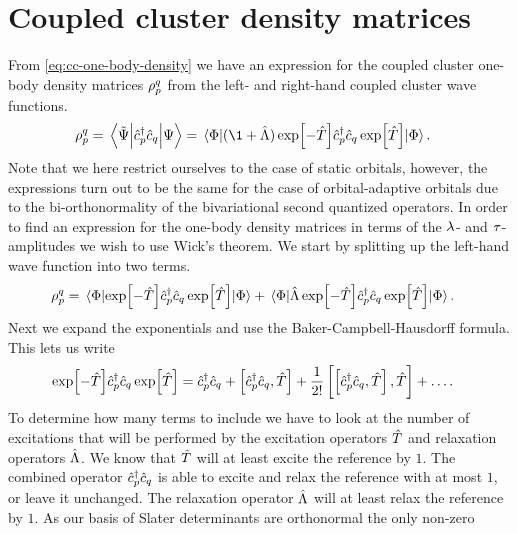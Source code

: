 \chapter{Coupled cluster density matrices}
    From \autoref{eq:cc-one-body-density} we have an expression for the coupled
    cluster one-body density matrices $\rho^q_p$ from the left- and
    right-hand coupled cluster wave functions.
    \begin{align}
        \densityten^{q}_{p}
        &= \mel{\tilde{\Psi}}{\ccr{p}\can{q}}{\Psi}
        = \mel{\slat}{
            (\1 + \clustl)
            \exp[-\clust]
            \ccr{p}\can{q}
            \exp[\clust]
        }{\slat}.
    \end{align}
    Note that we here restrict ourselves to the case of static orbitals,
    however, the expressions turn out to be the same for the case of
    orbital-adaptive orbitals due to the bi-orthonormality of the bivariational
    second quantized operators.
    In order to find an expression for the one-body density matrices in terms of
    the $\lambda$- and $\tau$-amplitudes we wish to use Wick's theorem.
    We start by splitting up the left-hand wave function into two terms.
    \begin{align}
        \rho^q_p
        &= \mel{\Phi}{
            \exp[-\hat{T}]
            \hat{c}_{p}^{\dagger}\hat{c}_{q}
            \exp[\hat{T}]
        }{\Phi}
        + \mel{\Phi}{
            \hat{\Lambda}\exp[-\hat{T}]
            \hat{c}_{p}^{\dagger}\hat{c}_{q}
            \exp[\hat{T}]
        }{\Phi}.
    \end{align}
    Next we expand the exponentials and use the Baker-Campbell-Hausdorff
    formula.
    This lets us write
    \begin{align}
        \exp[-\hat{T}]
        \hat{c}_{p}^{\dagger}\hat{c}_{q}
        \exp[\hat{T}]
        &= \hat{c}_{p}^{\dagger}\hat{c}_{q}
        + \left[\hat{c}_{p}^{\dagger}\hat{c}_{q}, \hat{T}\right]
        + \frac{1}{2!}\left[\left[\hat{c}_{p}^{\dagger}\hat{c}_{q}, \hat{T}\right], \hat{T}\right]
        + \dots.
    \end{align}
    To determine how many terms to include we have to look at the number of
    excitations that will be performed by the excitation operators $\hat{T}$ and
    relaxation operators $\hat{\Lambda}$.
    We know that $\hat{T}$ will at least excite the reference by $1$.
    The combined operator $\hat{c}_{p}^{\dagger}\hat{c}_{q}$ is able to excite and relax the
    reference with at most $1$, or leave it unchanged.
    The relaxation operator $\hat{\Lambda}$ will at least relax the reference by $1$.
    As our basis of Slater determinants are orthonormal the only non-zero
